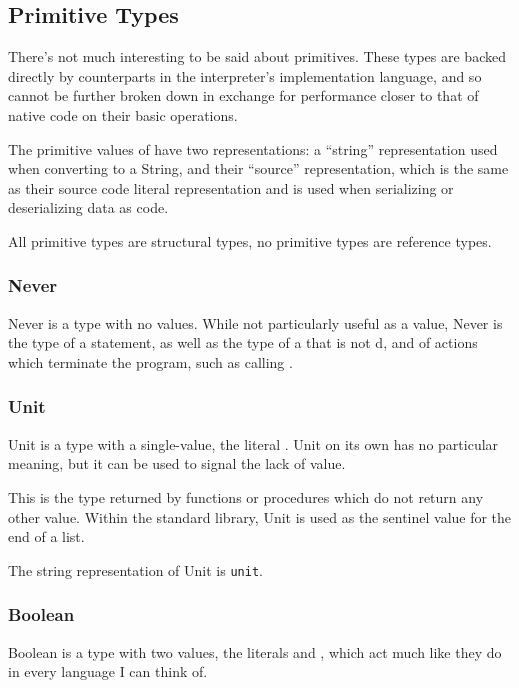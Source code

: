 \subsection{Primitive Types}

There's not much interesting to be said about primitives. These types are
backed directly by counterparts in the interpreter's implementation language,
and so cannot be further broken down in exchange for performance closer to
that of native code on their basic operations.

The primitive values of \Trilogy{} have two representations: a ``string''
representation used when converting to a String, and their ``source''
representation, which is the same as their source code literal representation
and is used when serializing or deserializing data as code.

All primitive types are structural types, no primitive types are reference
types.

\subsubsection{Never}

Never is a type with no values. While not particularly useful as a value,
Never is the type of a  statement, as well as the type of
a  that is not d, and of actions which terminate the
program, such as calling .

\subsubsection{Unit}

Unit is a type with a single-value, the literal . Unit on its own
has no particular meaning, but it can be used to signal the lack of value.

This is the type returned by functions or procedures which do not return
any other value. Within the standard library, Unit is used as the sentinel
value for the end of a list.

The string representation of Unit is \texttt{unit}.

\subsubsection{Boolean}

Boolean is a type with two values, the literals  and ,
which act much like they do in every language I can think of.

